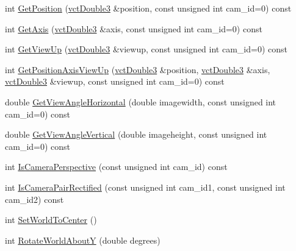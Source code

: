 \begin{DoxyCompactItemize}
\item 
int \hyperlink{classsvl_sample_camera_geometry_afb39bdd80a14a9f4b1b90f88ad29201f}{Get\-Position} (\hyperlink{vct_fixed_size_vector_types_8h_a4a89122c9d7f72c3f31fe8126e17c3af}{vct\-Double3} \&position, const unsigned int cam\-\_\-id=0) const 
\item 
int \hyperlink{classsvl_sample_camera_geometry_a7f2a014a519626ae96ee750fd58b7b1c}{Get\-Axis} (\hyperlink{vct_fixed_size_vector_types_8h_a4a89122c9d7f72c3f31fe8126e17c3af}{vct\-Double3} \&axis, const unsigned int cam\-\_\-id=0) const 
\item 
int \hyperlink{classsvl_sample_camera_geometry_a544b13a54719dbf1a77aa5ce10ba2c91}{Get\-View\-Up} (\hyperlink{vct_fixed_size_vector_types_8h_a4a89122c9d7f72c3f31fe8126e17c3af}{vct\-Double3} \&viewup, const unsigned int cam\-\_\-id=0) const 
\item 
int \hyperlink{classsvl_sample_camera_geometry_af3f63bfae535b243e0cfc62f60d384cb}{Get\-Position\-Axis\-View\-Up} (\hyperlink{vct_fixed_size_vector_types_8h_a4a89122c9d7f72c3f31fe8126e17c3af}{vct\-Double3} \&position, \hyperlink{vct_fixed_size_vector_types_8h_a4a89122c9d7f72c3f31fe8126e17c3af}{vct\-Double3} \&axis, \hyperlink{vct_fixed_size_vector_types_8h_a4a89122c9d7f72c3f31fe8126e17c3af}{vct\-Double3} \&viewup, const unsigned int cam\-\_\-id=0) const 
\item 
double \hyperlink{classsvl_sample_camera_geometry_a4d5a01caf8efe171739dec0b31d69c66}{Get\-View\-Angle\-Horizontal} (double imagewidth, const unsigned int cam\-\_\-id=0) const 
\item 
double \hyperlink{classsvl_sample_camera_geometry_ab2ea225f8e4d652d91c54ba0c2ea824e}{Get\-View\-Angle\-Vertical} (double imageheight, const unsigned int cam\-\_\-id=0) const 
\item 
int \hyperlink{classsvl_sample_camera_geometry_ae785787ab8b1c68cd7516fcdfdc056db}{Is\-Camera\-Perspective} (const unsigned int cam\-\_\-id) const 
\item 
int \hyperlink{classsvl_sample_camera_geometry_a9c067b342b467eb20db1832da98b9a4f}{Is\-Camera\-Pair\-Rectified} (const unsigned int cam\-\_\-id1, const unsigned int cam\-\_\-id2) const 
\item 
int \hyperlink{classsvl_sample_camera_geometry_a7acde8951ac37d5094f0f2d4ad2ffece}{Set\-World\-To\-Center} ()
\item 
int \hyperlink{classsvl_sample_camera_geometry_ad582b4b6aabbc82c01ef9e42b70d8b65}{Rotate\-World\-About\-Y} (double degrees)
\item 

\end{DoxyCompactItemize}

